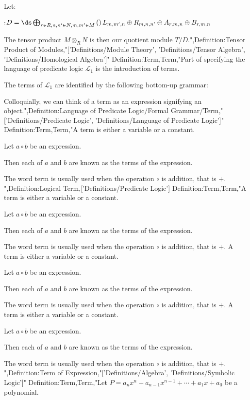 Let:

:$D = \ds \bigoplus_{r \in R, n, n' \in N, m, m' \in M}  \left(   \right){L_{m, m', n} \oplus R_{m, n, n'} \oplus A_{r, m, n} \oplus B_{r, m, n} }$

The tensor product $M \otimes_R N$ is then our quotient module $T / D$.",Definition:Tensor Product of Modules,"['Definitions/Module Theory', 'Definitions/Tensor Algebra', 'Definitions/Homological Algebra']"
Definition:Term,Term,"Part of specifying the language of predicate logic $\mathcal L_1$ is the introduction of terms.


The terms of $\mathcal L_1$ are identified by the following bottom-up grammar:






Colloquially, we can think of a term as an expression signifying an object.",Definition:Language of Predicate Logic/Formal Grammar/Term,"['Definitions/Predicate Logic', 'Definitions/Language of Predicate Logic']"
Definition:Term,Term,"A term is either a variable or a constant.


Let $a \circ b$ be an expression.

Then each of $a$ and $b$ are known as the terms of the expression.


The word term is usually used when the operation $\circ$ is addition, that is $+$.
",Definition:Logical Term,['Definitions/Predicate Logic']
Definition:Term,Term,"A term is either a variable or a constant.


Let $a \circ b$ be an expression.

Then each of $a$ and $b$ are known as the terms of the expression.


The word term is usually used when the operation $\circ$ is addition, that is $+$.
A term is either a variable or a constant.


Let $a \circ b$ be an expression.

Then each of $a$ and $b$ are known as the terms of the expression.


The word term is usually used when the operation $\circ$ is addition, that is $+$.
A term is either a variable or a constant.


Let $a \circ b$ be an expression.

Then each of $a$ and $b$ are known as the terms of the expression.


The word term is usually used when the operation $\circ$ is addition, that is $+$.
",Definition:Term of Expression,"['Definitions/Algebra', 'Definitions/Symbolic Logic']"
Definition:Term,Term,"Let $P = a_n x^n + a_{n - 1} x^{n - 1} + \cdots + a_1 x + a_0$ be a polynomial.

